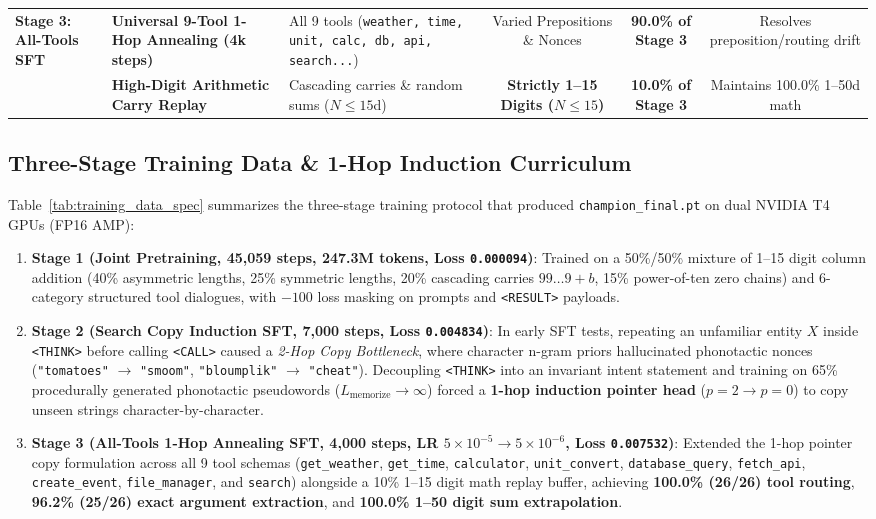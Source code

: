\documentclass[10pt,twocolumn]{article}
\begin{document}
\begin{table}[t]
{\begin{tabular}{@{}lllccc@{}}
\midrule
\multirow{2}{*}{\textbf{Stage 3: All-Tools SFT}} 
 & \textbf{Universal 9-Tool 1-Hop Annealing (4k steps)} & All 9 tools (\texttt{weather, time, unit, calc, db, api, search...}) & Varied Prepositions \& Nonces & \textbf{90.0\% of Stage 3} & Resolves preposition/routing drift \\
 & \textbf{High-Digit Arithmetic Carry Replay} & Cascading carries \& random sums ($N \le 15$d) & \textbf{Strictly 1--15 Digits ($N \le 15$)} & \textbf{10.0\% of Stage 3} & Maintains 100.0\% 1--50d math \\
\bottomrule
\end{tabular}%
}
\end{table}

\subsection{Three-Stage Training Data \& 1-Hop Induction Curriculum}

Table~\ref{tab:training_data_spec} summarizes the three-stage training protocol that produced \texttt{champion\_final.pt} on dual NVIDIA T4 GPUs (FP16 AMP):
\begin{enumerate}[leftmargin=*,nosep]
    \item \textbf{Stage 1 (Joint Pretraining, 45,059 steps, 247.3M tokens, Loss \texttt{0.000094})}: Trained on a 50\%/50\% mixture of 1--15 digit column addition (40\% asymmetric lengths, 25\% symmetric lengths, 20\% cascading carries $99\dots9+b$, 15\% power-of-ten zero chains) and 6-category structured tool dialogues, with $-100$ loss masking on prompts and \texttt{<RESULT>} payloads.
    \item \textbf{Stage 2 (Search Copy Induction SFT, 7,000 steps, Loss \texttt{0.004834})}: In early SFT tests, repeating an unfamiliar entity $X$ inside \texttt{<THINK>} before calling \texttt{<CALL>} caused a \emph{2-Hop Copy Bottleneck}, where character n-gram priors hallucinated phonotactic nonces (\texttt{"tomatoes"} $\to$ \texttt{"smoom"}, \texttt{"bloumplik"} $\to$ \texttt{"cheat"}). Decoupling \texttt{<THINK>} into an invariant intent statement and training on 65\% procedurally generated phonotactic pseudowords ($L_{\text{memorize}} \to \infty$) forced a \textbf{1-hop induction pointer head} ($p=2 \to p=0$) to copy unseen strings character-by-character.
    \item \textbf{Stage 3 (All-Tools 1-Hop Annealing SFT, 4,000 steps, LR $5\times 10^{-5} \to 5\times 10^{-6}$, Loss \texttt{0.007532})}: Extended the 1-hop pointer copy formulation across all 9 tool schemas (\texttt{get\_weather}, \texttt{get\_time}, \texttt{calculator}, \texttt{unit\_convert}, \texttt{database\_query}, \texttt{fetch\_api}, \texttt{create\_event}, \texttt{file\_manager}, and \texttt{search}) alongside a 10\% 1--15 digit math replay buffer, achieving \textbf{100.0\% (26/26) tool routing}, \textbf{96.2\% (25/26) exact argument extraction}, and \textbf{100.0\% 1--50 digit sum extrapolation}.
\end{enumerate}
\end{document}
